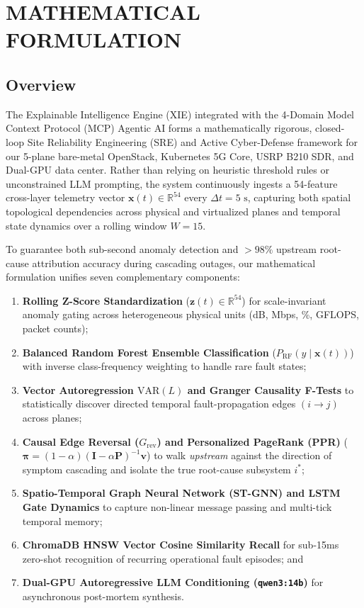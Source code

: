 
\chapter{MATHEMATICAL FORMULATION}

\section{Overview}
The Explainable Intelligence Engine (XIE) integrated with the 4-Domain Model Context Protocol (MCP) Agentic AI forms a mathematically rigorous, closed-loop Site Reliability Engineering (SRE) and Active Cyber-Defense framework for our 5-plane bare-metal OpenStack, Kubernetes 5G Core, USRP B210 SDR, and Dual-GPU data center. Rather than relying on heuristic threshold rules or unconstrained LLM prompting, the system continuously ingests a 54-feature cross-layer telemetry vector $\mathbf{x}(t) \in \mathbb{R}^{54}$ every $\Delta t = 5\text{ s}$, capturing both spatial topological dependencies across physical and virtualized planes and temporal state dynamics over a rolling window $W = 15$.

To guarantee both sub-second anomaly detection and $>98\%$ upstream root-cause attribution accuracy during cascading outages, our mathematical formulation unifies seven complementary components:
\begin{enumerate}
    \item \textbf{Rolling Z-Score Standardization} ($\mathbf{z}(t) \in \mathbb{R}^{54}$) for scale-invariant anomaly gating across heterogeneous physical units (dB, Mbps, \%, GFLOPS, packet counts);
    \item \textbf{Balanced Random Forest Ensemble Classification} ($P_{\text{RF}}(y \mid \mathbf{x}(t))$) with inverse class-frequency weighting to handle rare fault states;
    \item \textbf{Vector Autoregression $\text{VAR}(L)$ and Granger Causality F-Tests} to statistically discover directed temporal fault-propagation edges $(i \to j)$ across planes;
    \item \textbf{Causal Edge Reversal ($G_{\text{rev}}$) and Personalized PageRank (PPR)} ($\boldsymbol{\pi} = (1-\alpha)(\mathbf{I}-\alpha\mathbf{P})^{-1}\mathbf{v}$) to walk \textit{upstream} against the direction of symptom cascading and isolate the true root-cause subsystem $i^*$;
    \item \textbf{Spatio-Temporal Graph Neural Network (ST-GNN) and LSTM Gate Dynamics} to capture non-linear message passing and multi-tick temporal memory;
    \item \textbf{ChromaDB HNSW Vector Cosine Similarity Recall} for sub-15ms zero-shot recognition of recurring operational fault episodes; and
    \item \textbf{Dual-GPU Autoregressive LLM Conditioning (\texttt{qwen3:14b})} for asynchronous post-mortem synthesis.
\end{enumerate}

